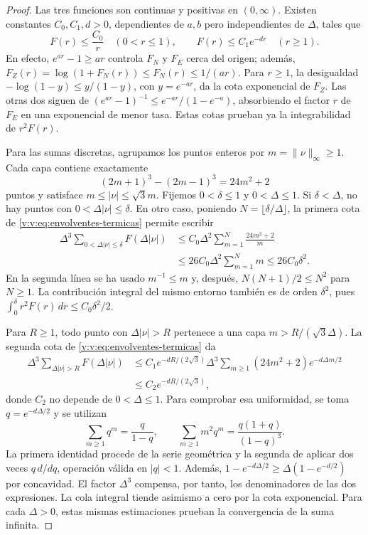 \begin{proof}
Las tres funciones son continuas y positivas en \((0,\infty)\).
Existen constantes \(C_0,C_1,d>0\), dependientes de \(a,b\) pero
independientes de \(\Delta\), tales que
\begin{equation}
 F(r)\leq\frac{C_0}{r}\quad(0<r\leq1),\qquad
 F(r)\leq C_1e^{-dr}\quad(r\geq1).
 \label{v:v:eq:envolventes-termicas}
\end{equation}
En efecto, \(e^{ar}-1\geq ar\) controla \(F_N\) y \(F_E\)
cerca del origen; además,
\(F_Z(r)=\log(1+F_N(r))\leq F_N(r)\leq1/(ar)\).
Para \(r\geq1\), la desigualdad
\(-\log(1-y)\leq y/(1-y)\), con \(y=e^{-ar}\), da la cota
exponencial de \(F_Z\). Las otras dos siguen de
\((e^{ar}-1)^{-1}\leq e^{-ar}/(1-e^{-a})\), absorbiendo el factor
\(r\) de \(F_E\) en una exponencial de menor tasa. Estas cotas
prueban ya la integrabilidad de \(r^2F(r)\).

Para las sumas discretas, agrupamos los puntos enteros por
\(m=\|\nu\|_\infty\geq1\). Cada capa contiene exactamente
\[
 (2m+1)^3-(2m-1)^3=24m^2+2
\]
puntos y satisface \(m\leq|\nu|\leq\sqrt3m\).
Fijemos \(0<\delta\leq1\) y \(0<\Delta\leq1\).
Si \(\delta<\Delta\), no hay puntos con
\(0<\Delta|\nu|\leq\delta\). En otro caso, poniendo
\(N=\lfloor\delta/\Delta\rfloor\), la primera cota de
\eqref{v:v:eq:envolventes-termicas} permite escribir
\begin{align*}
 \Delta^3\!\sum_{0<\Delta|\nu|\leq\delta}F(\Delta|\nu|)
 &\leq C_0\Delta^2\sum_{m=1}^{N}\frac{24m^2+2}{m}\\
 &\leq26C_0\Delta^2\sum_{m=1}^{N}m
 \leq26C_0\delta^2.
\end{align*}
En la segunda línea se ha usado \(m^{-1}\leq m\) y, después,
\(N(N+1)/2\leq N^2\) para \(N\geq1\).
La contribución integral del mismo entorno también es de orden
\(\delta^2\), pues
\(\int_0^\delta r^2F(r)\,dr\leq C_0\delta^2/2\).

Para \(R\geq1\), todo punto con \(\Delta|\nu|>R\) pertenece
a una capa \(m>R/(\sqrt3\Delta)\). La segunda cota de
\eqref{v:v:eq:envolventes-termicas} da
\begin{align*}
 \Delta^3\!\sum_{\Delta|\nu|>R}F(\Delta|\nu|)
 &\leq C_1e^{-dR/(2\sqrt3)}
 \Delta^3\sum_{m\geq1}(24m^2+2)e^{-d\Delta m/2}\\
 &\leq C_2e^{-dR/(2\sqrt3)},
\end{align*}
donde \(C_2\) no depende de \(0<\Delta\leq1\). Para comprobar
esa uniformidad, se toma \(q=e^{-d\Delta/2}\) y se utilizan
\[
 \sum_{m\geq1}q^m=\frac{q}{1-q},\qquad
 \sum_{m\geq1}m^2q^m=\frac{q(1+q)}{(1-q)^3}.
\]
La primera identidad procede de la serie geométrica y la segunda de
aplicar dos veces \(q\,d/dq\), operación válida en \(|q|<1\).
Además,
\(1-e^{-d\Delta/2}\geq\Delta(1-e^{-d/2})\) por concavidad.
El factor \(\Delta^3\) compensa, por tanto, los denominadores de
las dos expresiones. La cola integral tiende asimismo a cero por la
cota exponencial. Para cada \(\Delta>0\), estas mismas estimaciones
prueban la convergencia de la suma infinita.


\end{proof}
